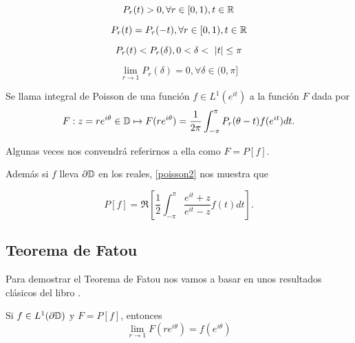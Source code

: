 \begin{equation}
    P_r(t) > 0, \forall r \in [0,1), t \in \mathbb{R}
\end{equation}

\begin{equation}
    P_r(t) = P_r(-t), \forall r \in [0,1), t \in \mathbb{R}
\end{equation}

\begin{equation}
    P_r(t) < P_r(\delta), 0 < \delta < \abs{t} \leq \pi
\end{equation}

\begin{equation}
    \lim_{r \rightarrow 1} P_r(\delta) = 0, \forall \delta \in (0,\pi]
\end{equation}

\bigskip \par

\begin{definition}
    Se llama integral de Poisson de una función $f \in L^1(e^{it})$ a la función $F$ dada por
    \begin{equation*}
        F: z=re^{i \theta} \in \mathbb{D} \mapsto F(re^{i \theta}) = \dfrac{1}{2 \pi} \int_{- \pi}^{\pi} P_r (\theta - t) f(e^{it}) dt.
    \end{equation*}

    Algunas veces nos convendrá referirnos a ella como $F=P[f]$.
\end{definition}

\bigskip

Además si $f$ lleva $\partial \mathbb{D}$ en los reales, \ref{poisson2} nos muestra que

\begin{equation*}
     P[f] = \Re \left[ \dfrac{1}{2} \int_{-\pi}^{\pi} \dfrac{e^{it} + z}{e^{it} - z} f(t) dt \right].
\end{equation*}

\subsection{Teorema de Fatou}

Para demostrar el Teorema de Fatou nos vamos a basar en unos resultados clásicos del libro \citet[chap. 11]{rudin}.

\begin{theorem}
    \label{fatouaux1}
    Si $f \in L^1(\partial \mathbb{D})$ y $F = P[f]$, entonces
    \begin{equation*}
        \lim_{r \rightarrow 1} F(re^{i \theta}) = f(e^{i \theta})
    \end{equation*}
\end{theorem}

